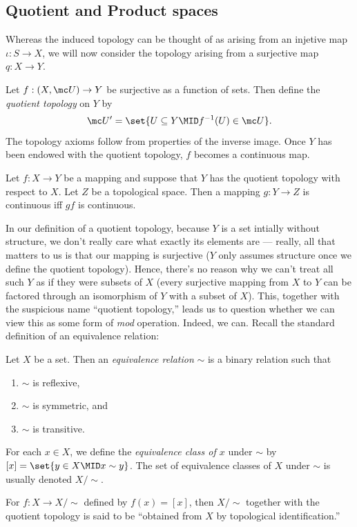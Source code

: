 \documentclass{fkbook}
\begin{document}
\begin{adjustwidth}{1em}{1em}
  \subsection{Quotient and Product spaces}
  Whereas the induced topology can be thought of as arising from an
  injetive map $\iota : S \to X$, we will now consider the topology
  arising from a surjective map $q : X \to Y$.
  \begin{definition}
    Let $f : (X, \mc U) \to Y$ be surjective as a function of sets.
    Then define the \emph{quotient topology} on $Y$ by
    \[
      \mc U' = \set{U \subseteq Y \MID f^{-1}(U) \in \mc U}.
    \]
    The topology axioms follow from properties of the inverse image.
    Once $Y$ has been endowed with the quotient topology, $f$ becomes
    a continuous map.
  \end{definition}
  \begin{theorem}
    Let $f : X \to Y$ be a mapping and suppose that $Y$ has the
    quotient topology with respect to $X$. Let $Z$ be a topological
    space. Then a mapping $g : Y \to Z$ is continuous iff $gf$ is
    continuous.
  \end{theorem}
  In our definition of a quotient topology, because $Y$ is a set
  intially without structure, we don't really care what exactly its
  elements are --- really, all that matters to us is that our mapping
  is surjective ($Y$ only assumes structure once we define the
  quotient topology). Hence, there's no reason why we can't treat all
  such $Y$ as if they were subsets of $X$ (every surjective mapping
  from $X$ to $Y$ can be factored through an isomorphism of $Y$ with a
  subset of $X$). This, together with the suspicious name ``quotient
  topology,'' leads us to question whether we can view this as some
  form of \emph{mod} operation. Indeed, we can. Recall the standard
  definition of an equivalence relation: \clearpage
  \begin{definition}
    Let $X$ be a set. Then an \emph{equivalence relation} $\sim$ is a
    binary relation such that
    \begin{enumerate}
      \item $\sim$ is reflexive,
      \item $\sim$ is symmetric, and
      \item $\sim$ is transitive.
    \end{enumerate}
    For each $x \in X$, we define the \emph{equivalence class of $x$}
    under $\sim$ by $[x] = \set{y \in X \MID x \sim y}$. The set of
    equivalence classes of $X$ under $\sim$ is usually denoted
    $X/\sim$.
  \end{definition}
  For $f : X \to X/\sim$ defined by $f(x) = [x]$, then $X / \sim$
  together with the quotient topology is said to be ``obtained from
  $X$ by topological identification.''


\end{adjustwidth}
\end{document}

